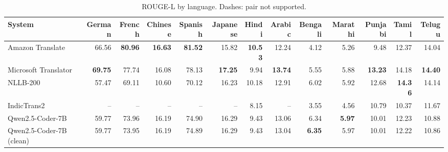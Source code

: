 \begin{table}[t]
\centering
\caption{ROUGE-L by language. Dashes: pair not supported.\label{tab:rouge_l_lang}}
\begin{tabular}{lrrrrrrrrrrrr}
\toprule
System & German & French & Chinese & Spanish & Japanese & Hindi & Arabic & Bengali & Marathi & Punjabi & Tamil & Telugu \\
\midrule
Amazon Translate & 66.56 & \textbf{80.96} & \textbf{16.63} & \textbf{81.52} & 15.82 & \textbf{10.53} & 12.24 & 4.12 & 5.26 & 9.48 & 12.37 & 14.04 \\
Microsoft Translator & \textbf{69.75} & 77.74 & 16.08 & 78.13 & \textbf{17.25} & 9.94 & \textbf{13.74} & 5.55 & 5.88 & \textbf{13.23} & 14.18 & \textbf{14.40} \\
NLLB-200 & 57.47 & 69.11 & 10.60 & 70.12 & 16.23 & 10.18 & 12.91 & 6.02 & 5.92 & 12.68 & \textbf{14.36} & 14.14 \\
IndicTrans2 & -- & -- & -- & -- & -- & 8.15 & -- & 3.55 & 4.56 & 10.79 & 10.37 & 11.67 \\
Qwen2.5-Coder-7B & 59.77 & 73.96 & 16.19 & 74.90 & 16.29 & 9.43 & 13.06 & 6.34 & \textbf{5.97} & 10.01 & 12.23 & 10.88 \\
Qwen2.5-Coder-7B (clean) & 59.77 & 73.95 & 16.19 & 74.89 & 16.29 & 9.43 & 13.04 & \textbf{6.35} & 5.97 & 10.01 & 12.22 & 10.86 \\
\bottomrule
\end{tabular}
\end{table}
